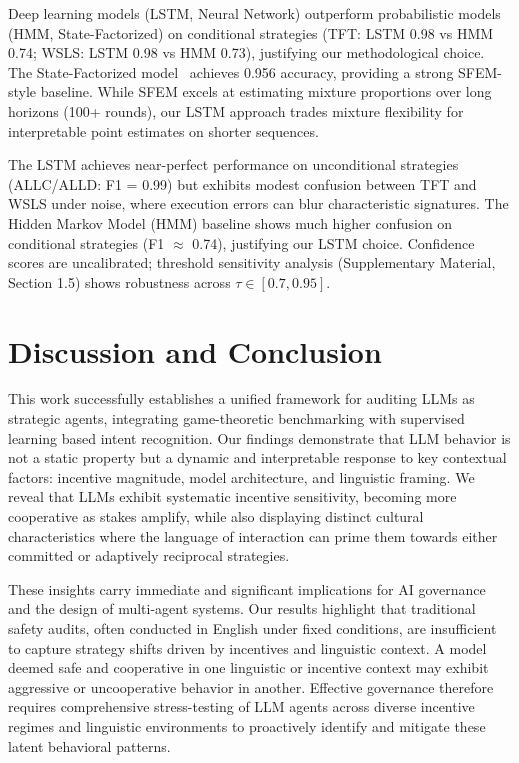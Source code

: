 \documentclass{article}
\begin{document}
Deep learning models (LSTM, Neural Network) outperform probabilistic models (HMM, State-Factorized) on conditional strategies (TFT: LSTM 0.98 vs HMM 0.74; WSLS: LSTM 0.98 vs HMM 0.73), justifying our methodological choice. The State-Factorized model~\cite{fontana2025nicer} achieves 0.956 accuracy, providing a strong SFEM-style baseline. While SFEM excels at estimating mixture proportions over long horizons (100+ rounds), our LSTM approach trades mixture flexibility for interpretable point estimates on shorter sequences.

 The LSTM achieves near-perfect performance on unconditional strategies (ALLC/ALLD: F1 = 0.99) but exhibits modest confusion between TFT and WSLS under noise, where execution errors can blur characteristic signatures. The Hidden Markov Model (HMM) baseline shows much higher confusion on conditional strategies (F1 $\approx$ 0.74), justifying our LSTM choice. Confidence scores are uncalibrated; threshold sensitivity analysis (Supplementary Material, Section 1.5) shows robustness across $\tau \in [0.7, 0.95]$.

\section{Discussion and Conclusion}
\label{sec:discussion}

This work successfully establishes a unified framework for auditing LLMs as strategic agents, integrating game-theoretic benchmarking with supervised learning based intent recognition. Our findings demonstrate that LLM behavior is not a static property but a dynamic and interpretable response to key contextual factors: incentive magnitude, model architecture, and linguistic framing. We reveal that LLMs exhibit systematic incentive sensitivity, becoming more cooperative as stakes amplify, while also displaying distinct cultural characteristics  where the language of interaction can prime them towards either committed or adaptively reciprocal strategies.


These insights carry immediate and significant implications for AI governance and the design of multi-agent systems. Our results highlight that traditional safety audits, often conducted in English under fixed conditions, are insufficient to capture strategy shifts driven by incentives and linguistic context. A model deemed safe and cooperative in one linguistic or incentive context may exhibit aggressive or uncooperative behavior in another. Effective governance therefore requires comprehensive stress-testing of LLM agents across diverse incentive regimes and linguistic environments to proactively identify and mitigate these latent behavioral patterns.
\end{document}
